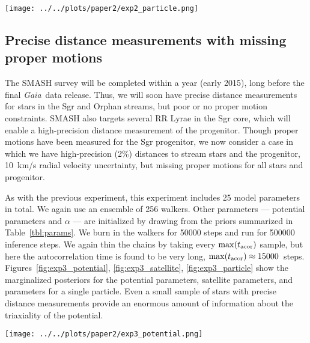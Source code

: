 \documentclass[letterpaper,12pt,preprint]{aastex}
\newcommand{\project}[1]{\textsl{#1}}
\newcommand{\gaia}{\project{Gaia}}
\newcommand{\Loffset}{\alpha}
\begin{document}
\begin{figure*}[!h]
\begin{center}
\texttt{[image: ../../plots/paper2/exp2\_particle.png]}
\caption{ Projections of the marginal posterior over parameters for one of the stars for observed stars and progenitor with near-future uncertainties (Section~\ref{sec:exp2}).   }\label{fig:exp2_particle}
\end{center}
\end{figure*}

\subsection{Precise distance measurements with missing proper motions}\label{sec:exp3}
The SMASH survey \citep{smashprop} will be completed within a year (early 2015), long before the final \gaia\, data release. Thus, we will soon have precise distance measurements for stars in the Sgr and Orphan streams, but poor or no proper motion constraints. SMASH also targets several RR Lyrae in the Sgr core, which will enable a high-precision distance measurement of the progenitor. Though proper motions have been measured for the Sgr progenitor, we now consider a case in which we have high-precision (2\%) distances to stream stars and the progenitor, 10~km/s radial velocity uncertainty, but missing proper motions for all stars and progenitor. 

As with the previous experiment, this experiment includes 25 model parameters in total. We again use an ensemble of 256 walkers. Other parameters --- potential parameters and $\Loffset$ --- are initialized by drawing from the priors summarized in Table~\ref{tbl:params}. We burn in the walkers for 50000 steps and run for 500000 inference steps. We again thin the chains by taking every $\max(t_{\rm acor})$ sample, but here the autocorrelation time is found to be very long, $\max(t_{\rm acor}) \approx 15000$~steps. Figures~\ref{fig:exp3_potential}, \ref{fig:exp3_satellite}, \ref{fig:exp3_particle} show the marginalized posteriors for the potential parameters, satellite parameters, and parameters for a single particle. Even a small sample of stars with precise distance measurements provide an enormous amount of information about the triaxiality of the potential.

\begin{figure*}[!h]
\begin{center}
\texttt{[image: ../../plots/paper2/exp3\_potential.png]}
\caption{ Same as Figure~\ref{fig:exp2_potential} but for data with no proper motion measurements. }\label{fig:exp3_potential}
\end{center}
\end{figure*}
\end{document}
